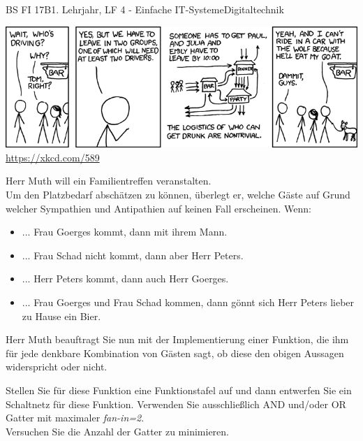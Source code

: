 \documentclass[oneside,openany,headings=optiontotoc,11pt,numbers=noenddot]{scrreprt}
\begin{document}
	\begin{worksheet}{BS FI 17B}{1. Lehrjahr, LF 4 - Einfache IT-Systeme}{Digitaltechnik}
		\begin{framed}
			\noindent
			\includegraphics[scale=0.62]{Bilder/logic_party.png}\\
			\tiny{\color{codegray}\url{https://xkcd.com/589}}
		\end{framed}
		\begin{framed}
			\noindent
			Herr Muth will ein Familientreffen veranstalten.\\
			Um den Platzbedarf abschätzen zu können, überlegt er, welche Gäste auf Grund welcher Sympathien und Antipathien auf keinen Fall erscheinen. Wenn:
			\begin{itemize}
				\item ... Frau Goerges kommt, dann mit ihrem Mann.
				\item ... Frau Schad nicht kommt, dann aber Herr Peters.
				\item ... Herr Peters kommt, dann auch Herr Goerges.
				\item ... Frau Goerges und Frau Schad kommen, dann gönnt sich Herr Peters lieber zu Hause ein Bier.
			\end{itemize}
		\par\bigskip\noindent
		Herr Muth beauftragt Sie nun mit der Implementierung einer Funktion, die ihm für jede denkbare Kombination von Gästen sagt, ob diese den obigen Aussagen widerspricht oder nicht.\par\bigskip\noindent
		Stellen Sie für diese Funktion eine Funktionstafel auf und dann entwerfen Sie ein Schaltnetz für diese Funktion. Verwenden Sie ausschließlich AND und/oder OR Gatter mit maximaler \textit{fan-in=2}.\\
		Versuchen Sie die Anzahl der Gatter zu minimieren.
		\end{framed}
	\end{worksheet}
\end{document}

